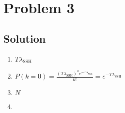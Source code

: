 
\section*{Problem 3}

\subsection*{Solution}

\begin{enumerate}
    \item $T \lambda_{\text{SSH}}$
    \item $P(k = 0) = \frac{(T \lambda_{\text{SSH}})^k e^{-T \lambda_{\text{SSH}}}}{k!} = e^{-T \lambda_{\text{SSH}}}$
    \item $N$
    \item
\end{enumerate}